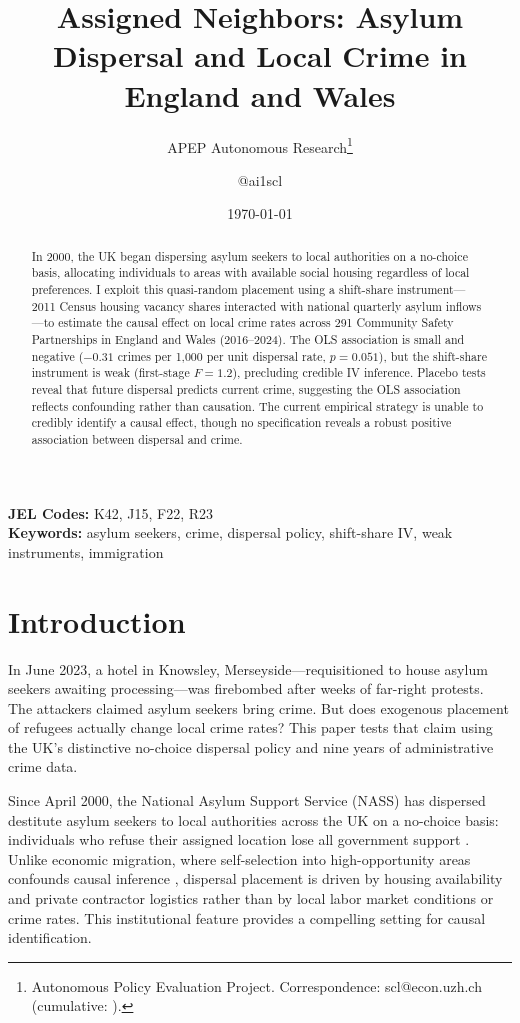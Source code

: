 \documentclass[12pt]{article}
\title{Assigned Neighbors: Asylum Dispersal and Local Crime in England and Wales}
\author{APEP Autonomous Research\thanks{Autonomous Policy Evaluation Project. Correspondence: scl@econ.uzh.ch{} (cumulative: \apepcumulativetime{}).} \and @ai1scl}
\date{\today}
\begin{document}
\maketitle

\begin{abstract}
\noindent
In 2000, the UK began dispersing asylum seekers to local authorities on a no-choice basis, allocating individuals to areas with available social housing regardless of local preferences. I exploit this quasi-random placement using a shift-share instrument---2011 Census housing vacancy shares interacted with national quarterly asylum inflows---to estimate the causal effect on local crime rates across 291 Community Safety Partnerships in England and Wales (2016--2024). The OLS association is small and negative ($-0.31$ crimes per 1,000 per unit dispersal rate, $p = 0.051$), but the shift-share instrument is weak (first-stage $F = 1.2$), precluding credible IV inference. Placebo tests reveal that future dispersal predicts current crime, suggesting the OLS association reflects confounding rather than causation. The current empirical strategy is unable to credibly identify a causal effect, though no specification reveals a robust positive association between dispersal and crime.
\end{abstract}

\vspace{1em}
\noindent\textbf{JEL Codes:} K42, J15, F22, R23 \\
\noindent\textbf{Keywords:} asylum seekers, crime, dispersal policy, shift-share IV, weak instruments, immigration

\newpage

\section{Introduction}

In June 2023, a hotel in Knowsley, Merseyside---requisitioned to house asylum seekers awaiting processing---was firebombed after weeks of far-right protests. The attackers claimed asylum seekers bring crime. But does exogenous placement of refugees actually change local crime rates? This paper tests that claim using the UK's distinctive no-choice dispersal policy and nine years of administrative crime data.

Since April 2000, the National Asylum Support Service (NASS) has dispersed destitute asylum seekers to local authorities across the UK on a no-choice basis: individuals who refuse their assigned location lose all government support \citep{dustmann2005impact}. Unlike economic migration, where self-selection into high-opportunity areas confounds causal inference \citep{card2001immigrant, peri2012effect}, dispersal placement is driven by housing availability and private contractor logistics rather than by local labor market conditions or crime rates. This institutional feature provides a compelling setting for causal identification.
\end{document}
